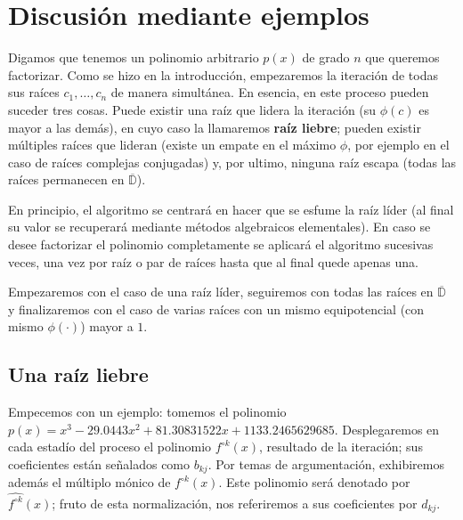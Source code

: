 \documentclass[oneside,11pt]{book}
\theoremstyle{definition}
\theoremstyle{plain}
\theoremstyle{remark}
\begin{document}
\chapter{Discusi\'on mediante ejemplos}

Digamos que tenemos un polinomio arbitrario $p(x)$ de grado $n$ que queremos factorizar. 
Como se hizo en la introducci\'on, 
empezaremos la iteraci\'on de todas sus ra\'ices $c_1,\dots,c_n$ de manera simult\'anea.
En esencia, en este proceso pueden suceder tres cosas. 
Puede existir una ra\'iz que lidera la iteraci\'on 
(su $\phi(c)$ es mayor a las dem\'as), en cuyo caso la llamaremos {\bf ra\'iz liebre}; 
pueden existir m\'ultiples ra\'ices que lideran 
(existe un empate en el m\'aximo $\phi$, por ejemplo en el caso de ra\'ices complejas conjugadas) y, 
por ultimo, ninguna ra\'iz escapa (todas las ra\'ices permanecen en $\overline{\mathbb{D}}$). 

En principio, el algoritmo se centrar\'a en hacer que se esfume la ra\'iz l\'ider 
(al final su valor se recuperar\'a mediante m\'etodos algebraicos elementales). 
En caso se desee factorizar el polinomio completamente se aplicar\'a el algoritmo sucesivas veces,
una vez por ra\'iz o par de ra\'ices hasta que al final quede apenas una.
\medskip

Empezaremos con el caso de una ra\'iz l\'ider, 
seguiremos con todas las ra\'ices en $\overline{\mathbb{D}}$ y 
finalizaremos con el caso de varias ra\'ices con un mismo equipotencial 
(con mismo $\phi(\cdot)$) mayor a $1$.
\medskip

\section{Una ra\'iz liebre}

Empecemos con un ejemplo:  
tomemos el polinomio $p(x)=x^3-29.0443x^2+81.30831522x+1133.2465629685$.
Desplegaremos en cada estad\'io del proceso el polinomio $f^{\circ k}(x)$, resultado de la iteraci\'on; 
sus coeficientes est\'an se\~nalados como $b_{kj}$. 
Por temas de argumentaci\'on,
exhibiremos adem\'as el m\'ultiplo m\'onico de $f^{\circ k}(x)$. 
Este polinomio ser\'a denotado por $\hat{f^{\circ k}}(x)$; 
fruto de esta normalizaci\'on, nos referiremos a  sus coeficientes por $d_{kj}$.
\end{document}
